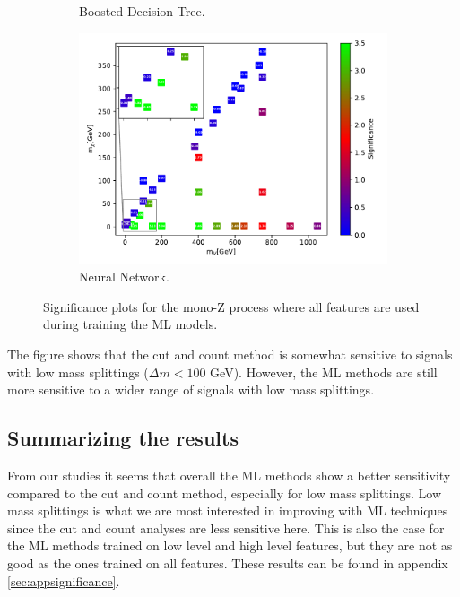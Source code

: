 \begin{figure}[H]
\begin{subfigure}[t!]{0.49\textwidth}
    \caption{Boosted Decision Tree.}
        \label{fig:signAllmonoZBDT}
    \end{subfigure}      
    \begin{subfigure}[t!]{0.49\textwidth}
    \includegraphics[width = \textwidth]{Figures/Significances/significance_NN_monoZ_All_level.pdf}
    \caption{Neural Network.}
        \label{fig:signAllmonoZNN}
    \end{subfigure}
    \caption{Significance plots for the mono-Z process where all features are used during training the ML models.}
    \label{fig:signAllmonoZ}
\end{figure}

The figure shows that the cut and count method is somewhat sensitive to signals with low mass splittings ($\Delta m < 100$ GeV). However, the ML methods are still more sensitive to a wider range of signals with low mass splittings. 



\subsection{Summarizing the results}
From our studies it seems that overall the ML methods show a better sensitivity compared to the cut and count method, especially for low mass splittings. Low mass splittings is what we are most interested in improving with ML techniques since the cut and count analyses are less sensitive here. This is also the case for the ML methods trained on low level and high level features, but they are not as good as the ones trained on all features. These results can be found in appendix \ref{sec:appsignificance}. 


